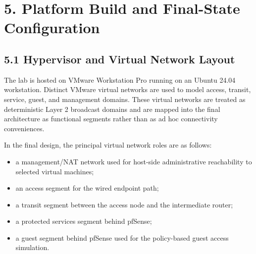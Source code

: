 \documentclass[11pt]{article}
\begin{document}

\section{5. Platform Build and Final-State Configuration}
\label{sec:platform-build-and-final-state-configuration}


\subsection{5.1 Hypervisor and Virtual Network Layout}
\label{sec:hypervisor-and-virtual-network-layout}

The lab is hosted on VMware Workstation Pro running on an Ubuntu 24.04 workstation. Distinct VMware virtual networks are used to model access, transit, service, guest, and management domains. These virtual networks are treated as deterministic Layer 2 broadcast domains and are mapped into the final architecture as functional segments rather than as ad hoc connectivity conveniences.

In the final design, the principal virtual network roles are as follows:

\begin{itemize}
    \item a management/NAT network used for host-side administrative reachability to selected virtual machines;
    \item an access segment for the wired endpoint path;
    \item a transit segment between the access node and the intermediate router;
    \item a protected services segment behind pfSense;
    \item a guest segment behind pfSense used for the policy-based guest access simulation.
\end{itemize}
\end{document}
